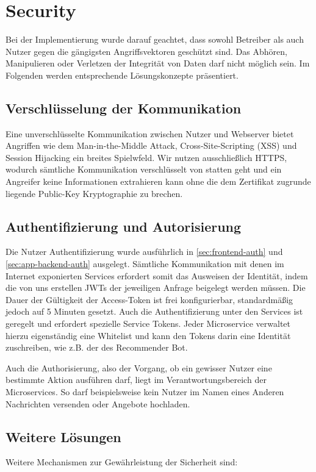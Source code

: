 \documentclass{article}
\begin{document}
\section{Security} %
Bei der Implementierung wurde darauf geachtet, dass sowohl Betreiber als auch Nutzer gegen die gängigsten Angriffsvektoren geschützt sind. Das Abhören, Manipulieren oder Verletzen der Integrität von Daten darf nicht möglich sein. Im Folgenden werden entsprechende Lösungskonzepte präsentiert.


\subsection{Verschlüsselung der Kommunikation}
Eine unverschlüsselte Kommunikation zwischen Nutzer und Webserver bietet Angriffen wie dem Man-in-the-Middle Attack, Cross-Site-Scripting (XSS) und Session Hijacking ein breites Spielwfeld. Wir nutzen ausschließlich HTTPS, wodurch sämtliche Kommunikation verschlüsselt von statten geht und ein Angreifer keine Informationen extrahieren kann ohne die dem Zertifikat zugrunde liegende Public-Key Kryptographie zu brechen.


\subsection{Authentifizierung und Autorisierung}
\label{sec:authentication}

Die Nutzer Authentifizierung wurde ausführlich in \autoref{sec:frontend-auth} und \autoref{sec:app-backend-auth} ausgelegt. Sämtliche Kommunikation mit denen im Internet exponierten Services erfordert somit das Ausweisen der Identität, indem die von uns erstellen JWTs der jeweiligen Anfrage beigelegt werden müssen. Die Dauer der Gültigkeit der Access-Token ist frei konfigurierbar, standardmäßig jedoch auf 5 Minuten gesetzt. Auch die Authentifizierung unter den Services ist geregelt und erfordert spezielle Service Tokens. Jeder Microservice verwaltet hierzu eigenständig eine Whitelist und kann den Tokens darin eine Identität zuschreiben, wie z.B. der des Recommender Bot.

Auch die Authorisierung, also der Vorgang, ob ein gewisser Nutzer eine bestimmte Aktion ausführen darf, liegt im Verantwortungsbereich der Microservices. So darf beispielsweise kein Nutzer im Namen eines Anderen Nachrichten versenden oder Angebote hochladen.


\subsection{Weitere Lösungen}
Weitere Mechanismen zur Gewährleistung der Sicherheit sind:
\end{document}
